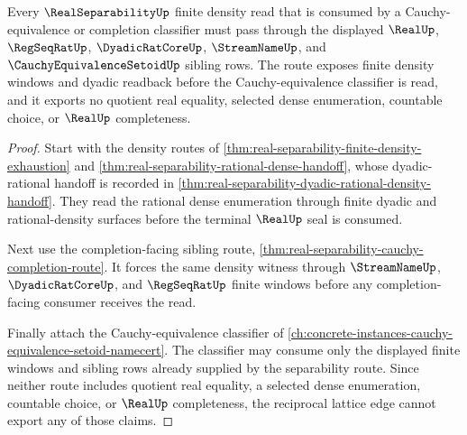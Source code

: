 \begin{theorem}
\label{thm:real-separability-cauchy-equivalence-lattice-route}
Every $\RealSeparabilityUp$ finite density read that is consumed by a Cauchy-equivalence or completion classifier must pass through the displayed $\RealUp$, $\RegSeqRatUp$, $\DyadicRatCoreUp$, $\StreamNameUp$, and $\CauchyEquivalenceSetoidUp$ sibling rows. The route exposes finite density windows and dyadic readback before the Cauchy-equivalence classifier is read, and it exports no quotient real equality, selected dense enumeration, countable choice, or $\RealUp$ completeness.
\end{theorem}
\begin{proof}
Start with the density routes of \autoref{thm:real-separability-finite-density-exhaustion} and \autoref{thm:real-separability-rational-dense-handoff}, whose dyadic-rational handoff is recorded in \autoref{thm:real-separability-dyadic-rational-density-handoff}. They read the rational dense enumeration through finite dyadic and rational-density surfaces before the terminal $\RealUp$ seal is consumed.

Next use the completion-facing sibling route, \autoref{thm:real-separability-cauchy-completion-route}. It forces the same density witness through $\StreamNameUp$, $\DyadicRatCoreUp$, and $\RegSeqRatUp$ finite windows before any completion-facing consumer receives the read.

Finally attach the Cauchy-equivalence classifier of \autoref{ch:concrete-instances-cauchy-equivalence-setoid-namecert}. The classifier may consume only the displayed finite windows and sibling rows already supplied by the separability route. Since neither route includes quotient real equality, a selected dense enumeration, countable choice, or $\RealUp$ completeness, the reciprocal lattice edge cannot export any of those claims.
\end{proof}
